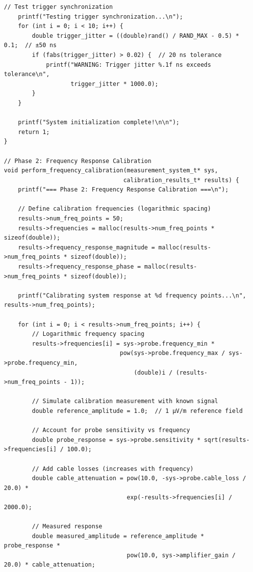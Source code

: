 \documentclass[11pt,a4paper]{article}
\theoremstyle{definition}
\begin{document}
\begin{lstlisting}[caption={Complete EM Calibration Implementation}]
    // Test trigger synchronization
    printf("Testing trigger synchronization...\n");
    for (int i = 0; i < 10; i++) {
        double trigger_jitter = ((double)rand() / RAND_MAX - 0.5) * 0.1;  // ±50 ns
        if (fabs(trigger_jitter) > 0.02) {  // 20 ns tolerance
            printf("WARNING: Trigger jitter %.1f ns exceeds tolerance\n", 
                   trigger_jitter * 1000.0);
        }
    }
    
    printf("System initialization complete!\n\n");
    return 1;
}

// Phase 2: Frequency Response Calibration
void perform_frequency_calibration(measurement_system_t* sys, 
                                  calibration_results_t* results) {
    printf("=== Phase 2: Frequency Response Calibration ===\n");
    
    // Define calibration frequencies (logarithmic spacing)
    results->num_freq_points = 50;
    results->frequencies = malloc(results->num_freq_points * sizeof(double));
    results->frequency_response_magnitude = malloc(results->num_freq_points * sizeof(double));
    results->frequency_response_phase = malloc(results->num_freq_points * sizeof(double));
    
    printf("Calibrating system response at %d frequency points...\n", results->num_freq_points);
    
    for (int i = 0; i < results->num_freq_points; i++) {
        // Logarithmic frequency spacing
        results->frequencies[i] = sys->probe.frequency_min * 
                                 pow(sys->probe.frequency_max / sys->probe.frequency_min,
                                     (double)i / (results->num_freq_points - 1));
        
        // Simulate calibration measurement with known signal
        double reference_amplitude = 1.0;  // 1 μV/m reference field
        
        // Account for probe sensitivity vs frequency
        double probe_response = sys->probe.sensitivity * sqrt(results->frequencies[i] / 100.0);
        
        // Add cable losses (increases with frequency)
        double cable_attenuation = pow(10.0, -sys->probe.cable_loss / 20.0) * 
                                   exp(-results->frequencies[i] / 2000.0);
        
        // Measured response
        double measured_amplitude = reference_amplitude * probe_response * 
                                   pow(10.0, sys->amplifier_gain / 20.0) * cable_attenuation;
        

\end{lstlisting}
\end{document}
